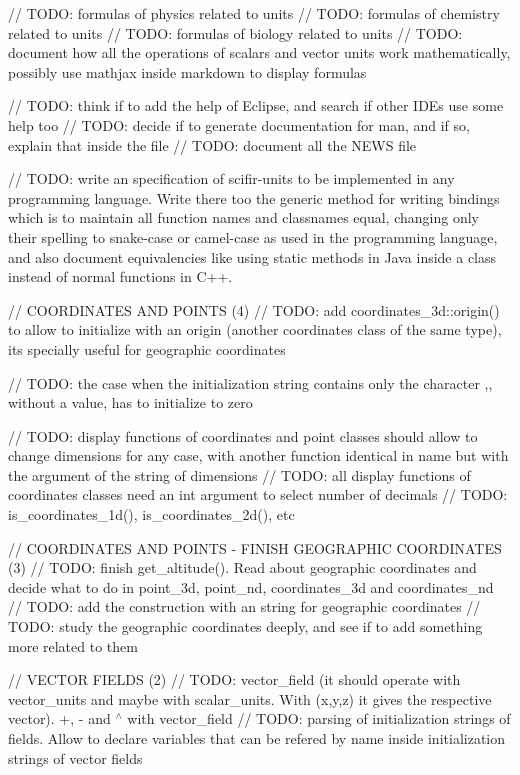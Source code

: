 // TODO\+: formulas of physics related to units // TODO\+: formulas of chemistry related to units // TODO\+: formulas of biology related to units // TODO\+: document how all the operations of scalars and vector units work mathematically, possibly use mathjax inside markdown to display formulas

// TODO\+: think if to add the help of Eclipse, and search if other IDEs use some help too // TODO\+: decide if to generate documentation for man, and if so, explain that inside the  file // TODO\+: document all the NEWS file

// TODO\+: write an specification of scifir-\/units to be implemented in any programming language. Write there too the generic method for writing bindings which is to maintain all function names and classnames equal, changing only their spelling to snake-\/case or camel-\/case as used in the programming language, and also document equivalencies like using static methods in Java inside a class instead of normal functions in C++.

// COORDINATES AND POINTS (4) // TODO\+: add coordinates\+\_\+3d\+::origin() to allow to initialize with an origin (another coordinates class of the same type), it\textquotesingle{}s specially useful for geographic coordinates

// TODO\+: the case when the initialization string contains only the character \textquotesingle{},\textquotesingle{}, without a value, has to initialize to zero

// TODO\+: display functions of coordinates and point classes should allow to change dimensions for any case, with another function identical in name but with the argument of the string of dimensions // TODO\+: all display functions of coordinates classes need an int argument to select number of decimals // TODO\+: is\+\_\+coordinates\+\_\+1d(), is\+\_\+coordinates\+\_\+2d(), etc

// COORDINATES AND POINTS -\/ FINISH GEOGRAPHIC COORDINATES (3) // TODO\+: finish get\+\_\+altitude(). Read about geographic coordinates and decide what to do in point\+\_\+3d, point\+\_\+nd, coordinates\+\_\+3d and coordinates\+\_\+nd // TODO\+: add the construction with an string for geographic coordinates // TODO\+: study the geographic coordinates deeply, and see if to add something more related to them

// VECTOR FIELDS (2) // TODO\+: vector\+\_\+field (it should operate with vector\+\_\+units and maybe with scalar\+\_\+units. With (x,y,z) it gives the respective vector). +, -\/ and \texorpdfstring{$^\wedge$}{\string^} with vector\+\_\+field // TODO\+: parsing of initialization strings of fields. Allow to declare variables that can be refered by name inside initialization strings of vector fields


